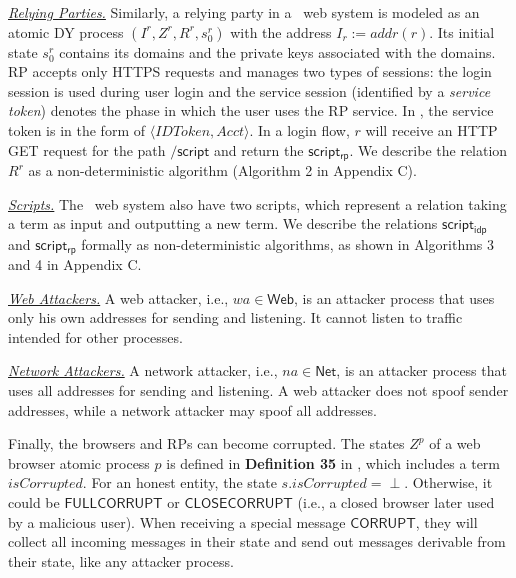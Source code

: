 \vspace{1mm}\noindent \underline{\em Relying Parties.} Similarly, a relying party in a \usso\ web system is modeled as an atomic DY process $(I^r, Z^r, R^r, s_0^r)$ with the address $I_r:=addr(r)$. Its initial state $s_0^r$ contains its domains and the private keys associated with the domains. RP accepts only HTTPS requests and manages two types of sessions: the login session is used during user login and the service session (identified by a {\em service token}) denotes the phase in which the user uses the RP service. In \usso, the service token is in the form of $\langle IDToken, Acct \rangle$. In a login flow, $r$ will receive an HTTP GET request for the path $\mathsf{/script}$ and return the $\mathsf{script_{rp}}$. We describe the relation $R^r$ as a non-deterministic algorithm (Algorithm 2 in Appendix C). 

\vspace{1mm}\noindent \underline{\em Scripts.} The \usso\ web system also have two scripts, which represent a relation taking a term as input and
outputting a new term. We describe the relations $\mathsf{script_{idp}}$ and $\mathsf{script_{rp}}$ formally as non-deterministic algorithms, as shown in Algorithms 3 and 4 in Appendix C.

\vspace{1mm}\noindent \underline{\em Web Attackers.} A web attacker, i.e., $wa \in \textsf{Web}$, is an attacker process that uses only his own addresses for sending and listening. It cannot listen to traffic intended for other processes. 

\vspace{1mm}\noindent \underline{\em Network Attackers.} A network attacker, i.e., $na \in \textsf{Net}$, is an attacker process that uses all addresses for sending and listening. 
A web attacker does not spoof sender addresses, while a network attacker may spoof all addresses. 

Finally, the browsers and RPs can become corrupted. The states $Z^p$ of a web browser atomic process $p$ is defined in {\bf Definition 35} in \cite{SPRESSO}, which includes a term $isCorrupted$. For an honest entity, the state $s.isCorrupted=\perp$. Otherwise, it could be $\textsf{FULLCORRUPT}$ or $\textsf{CLOSECORRUPT}$ (i.e., a closed browser later used by a malicious user). When receiving a special message $\mathsf{CORRUPT}$, they will collect all incoming messages in their state and send out messages derivable from their state, like any attacker process.

